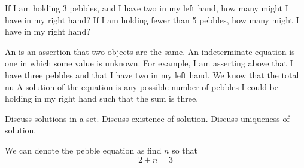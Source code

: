 
\sbasic



\sstart



If I am holding
3 pebbles, and I have two
in my left hand, how many
might I have in my right hand?
If I am holding
fewer than 5 pebbles, how
many might I have in my right hand?


An
is an assertion that
two objects are the same.
An indeterminate
equation is one in
which some value
is unknown.
For example, I am
asserting above
that I have three
pebbles and that
I have two in my
left hand.
We know that the
total nu
A solution of
the equation
is any possible
number of pebbles
I could be holding
in my right hand
such that the sum
is three.

Discuss solutions
in a set.
Discuss existence
of solution.
Discuss uniqueness
of solution.


We can
denote the pebble
equation as
find $n$ so that
\[
  2 + n = 3
\]

\strats
